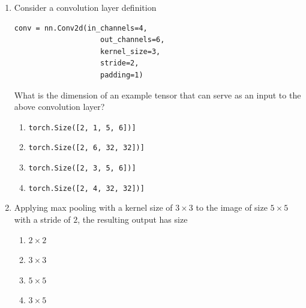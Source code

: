 \documentclass[11pt,letterpaper]{article}
\begin{document}
\begin{tcolorbox}[mcbox]
\begin{enumerate}[label=\textbf{Q\arabic*.}, leftmargin=*, itemsep=16pt]
What is the size of the Jacobian $J$?
\begin{enumerate}
\item  $4 \times 4$
\item $ 4\times 3$
\item $ 3\times 4$
\item $ 3 \times 3$
\end{enumerate}

\item Consider a convolution layer definition


          \begin{verbatim}
conv = nn.Conv2d(in_channels=4,  
                    out_channels=6, 
                    kernel_size=3, 
                    stride=2,
                    padding=1)
\end{verbatim}

What is the dimension of an example tensor that can serve as an input to the above convolution layer?

\begin{enumerate}
\item \texttt{torch.Size([2, 1, 5, 6])]}
\item \texttt{torch.Size([2, 6, 32, 32])]}
\item \texttt{torch.Size([2, 3, 5, 6])]}
\item \texttt{torch.Size([2, 4, 32, 32])]}
\end{enumerate}

\item Applying max pooling with a kernel size of $3\times 3$ to the image of size $5\times 5$ with a stride of $2$, the resulting output has size 

\begin{enumerate}
\item $2\times 2$
\item $3\times 3$
\item $5\times 5$
\item $3\times 5$
\end{enumerate}

  \end{enumerate}
\end{tcolorbox}

\newpage

\end{document}
